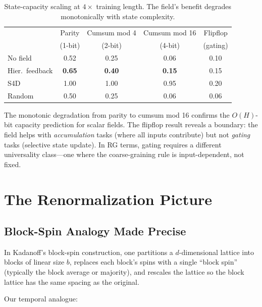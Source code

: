\documentclass[11pt,a4paper]{article}
\begin{document}
\begin{table}[h]
\centering
\caption{State-capacity scaling at $4\times$ training length.
  The field's benefit degrades monotonically with state complexity.}
\label{tab:multitask}
\begin{tabular}{@{}l cccc@{}}
\toprule
& Parity & Cumsum mod 4 & Cumsum mod 16 & Flipflop \\
& (1-bit) & (2-bit) & (4-bit) & (gating) \\
\midrule
No field       & 0.52 & 0.25 & 0.06 & 0.10 \\
Hier.\ feedback & \textbf{0.65} & \textbf{0.40} & \textbf{0.15} & 0.15 \\
S4D            & 1.00 & 1.00 & 0.95 & 0.20 \\
\midrule
Random         & 0.50 & 0.25 & 0.06 & 0.06 \\
\bottomrule
\end{tabular}
\end{table}

The monotonic degradation from parity to cumsum mod 16 confirms the
$O(H)$-bit capacity prediction for scalar fields.  The flipflop
result reveals a boundary: the field helps with \emph{accumulation}
tasks (where all inputs contribute) but not \emph{gating} tasks
(selective state update).  In RG terms, gating requires a different
universality class---one where the coarse-graining rule is
input-dependent, not fixed.


\section{The Renormalization Picture}
\label{sec:rg-analysis}

\subsection{Block-Spin Analogy Made Precise}

In Kadanoff's block-spin construction, one partitions a
$d$-dimensional lattice into blocks of linear size $b$, replaces each
block's spins with a single ``block spin'' (typically the block
average or majority), and rescales the lattice so the block lattice
has the same spacing as the original.

Our temporal analogue:
\end{document}
